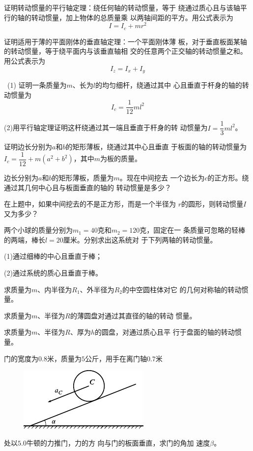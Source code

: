 \begin{exercises}

\exercise 证明转动惯量的平行轴定理：绕任何轴的转动惯量，等于
绕通过质心且与该轴平行的轴的转动惯量，加上物体的总质量乘
以两轴间距的平方。用公式表示为
\begin{equation*}
    I = I _ { c } + m r ^ { 2 }
\end{equation*}

\exercise 证明适用于薄的平面刚体的垂直轴定理：一个平面刚体薄
板，对于垂直板面某轴的转动惯量，等于绕平面内与该垂直轴相
交的任意两个正交轴的转动惯量之和。用公式表示为
\begin{equation*}
    I _ { z } = I _ { x } + I _ { y }
\end{equation*}

\exercise ~(1) 证明一条质量为$ m $、长为$ l $的均匀细杆，绕通过其中
心且垂直于杆身的轴的转动惯量为
\begin{equation*}
    I _ { c } = \frac { 1 } { 1 2 } m l ^ { 2 }
\end{equation*}

(2)用平行轴定理证明这杆绕通过其一端且垂直于杆身的转
动惯量为$  I = \dfrac { 1 } { 3 } m l ^ { 2 }  $。

\exercise 证明边长分别为$ a $和$ b $的矩形薄板，绕通过其中心且垂直
于板面的轴的转动惯量为$ I _ { c } = \dfrac { 1 } { 1 2 } + m \left( a ^ { 2 } + b ^ { 2 } \right)  $，其中$ m $为板的质量。

\exercise 边长分别为$ a $和$ b $的矩形薄板，质量为$ m $。现在中间挖去
一个边长为$ c $的正方形。绕通过其几何中心且与板面垂直的轴的
转动惯量是多少？

\exercise 在上题中，如果中间挖去的不是正方形，而是一个半径为
$ r $的圆形，则转动惯量$ I $又为多少？

\exercise 两个小球的质量分别为$  m _ { 1 } = 4 0   $克和$  m _ { 2 } = 1 2 0   $克，固定在一
条质量可忽略的轻棒的两端，棒长$  l = 2 0   $厘米。分别求出这系统对
于下列两轴的转动惯量。

(1)通过细棒的中心且垂直于棒；

(2)通过系统的质心且垂直于棒。

\exercise 求质量为$ m $、内半径为$ R_1 $、外半径为$ R_2 $的中空圆柱体对它
的几何对称轴的转动惯量。

\exercise 求质量为$ m $、半径为$ R $的薄圆盘对通过其直径的轴的转动
惯量。

\exercise 求质量为$ m $、半径为$ R $、厚为$ h $的圆盘，对通过质心且平
行于盘面的轴的转动惯量。

\exercise 门的宽度为$ 0.8 $米，质量为$ 5 $公斤，用手在离门轴$ 0.7 $米
\begin{figure}
    \centering
    \includegraphics{figure/fig10.25}
    \caption{}
    \label{fig:10.25}
\end{figure}
处以$ 5.0 $牛顿的力推门，力的方
向与门的板面垂直，求门的角加
速度$ \beta $。


\end{exercises}
